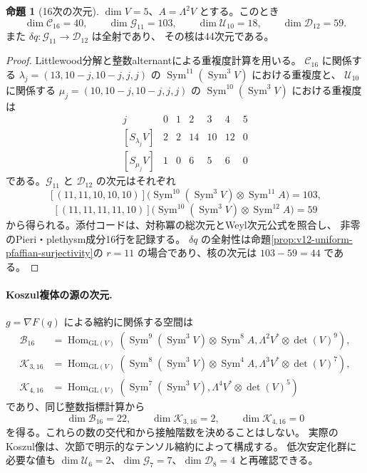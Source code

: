 \documentclass[a4paper,11pt]{ltjsarticle}
\theoremstyle{definition}
\newtheorem{proposition}[theorem]{命題}
\begin{document}
\begin{proposition}[16次の次元]
\label{prop:v13-sixteenth-characters}
$\dim V=5$、$A=\Lambda^2V$ とする。このとき
\[
 \dim\mathcal C_{16}=40,\qquad
 \dim\mathcal G_{11}=103,\qquad
 \dim\mathcal U_{10}=18,\qquad
 \dim\mathcal D_{12}=59.
\]
また $\delta q:\mathcal G_{11}\to\mathcal D_{12}$ は全射であり、
その核は44次元である。
\end{proposition}
\begin{proof}
Littlewood分解と整数alternantによる重複度計算を用いる。
$\mathcal C_{16}$ に関係する
$\lambda_j=(13,10-j,10-j,j,j)$ の
$\operatorname{Sym}^{11}(\operatorname{Sym}^3V)$ における重複度と、
$\mathcal U_{10}$ に関係する
$\mu_j=(10,10-j,10-j,j,j)$ の
$\operatorname{Sym}^{10}(\operatorname{Sym}^3V)$ における重複度は
\[
\begin{array}{c|rrrrrr}
 j&0&1&2&3&4&5\\\hline
 {}[S_{\lambda_j}V]&2&2&14&10&12&0\\
 {}[S_{\mu_j}V]&1&0&6&5&6&0
\end{array}
\]
である。$\mathcal G_{11}$ と $\mathcal D_{12}$ の次元はそれぞれ
\[
 [(11,11,10,10,10)]
 \bigl(\operatorname{Sym}^{10}(\operatorname{Sym}^3V)
                    \otimes\operatorname{Sym}^{11}A\bigr)=103,
\]
\[
 [(11,11,11,11,10)]
 \bigl(\operatorname{Sym}^{10}(\operatorname{Sym}^3V)
                    \otimes\operatorname{Sym}^{12}A\bigr)=59
\]
から得られる。添付コードは、対称冪の総次元とWeyl次元公式を照合し、
非零のPieri・plethysm成分16行を記録する。
$\delta q$ の全射性は命題\ref{prop:v12-uniform-pfaffian-surjectivity}の
$r=11$ の場合であり、核の次元は $103-59=44$ である。
\end{proof}

\paragraph{Koszul複体の源の次元.}
$g=\nabla F(q)$ による縮約に関係する空間は
\begin{align*}
 \mathcal B_{16}&=\operatorname{Hom}_{\mathrm{GL}(V)}
 \left(\operatorname{Sym}^{9}(\operatorname{Sym}^3V)\otimes\operatorname{Sym}^{8}A,
        \Lambda^2V^*\otimes\det(V)^9\right),\\
 \mathcal K_{3,16}&=\operatorname{Hom}_{\mathrm{GL}(V)}
 \left(\operatorname{Sym}^{8}(\operatorname{Sym}^3V)\otimes\operatorname{Sym}^{4}A,
        \Lambda^3V^*\otimes\det(V)^7\right),\\
 \mathcal K_{4,16}&=\operatorname{Hom}_{\mathrm{GL}(V)}
 \left(\operatorname{Sym}^{7}(\operatorname{Sym}^3V),
        \Lambda^4V^*\otimes\det(V)^5\right)
\end{align*}
であり、同じ整数指標計算から
\[
 \dim\mathcal B_{16}=22,\qquad
 \dim\mathcal K_{3,16}=2,\qquad
 \dim\mathcal K_{4,16}=0
\]
を得る。これらの数の交代和から接触階数を決めることはしない。
実際のKoszul像は、次節で明示的なテンソル縮約によって構成する。
低次安定化群に必要な値も
$\dim\mathcal U_6=2$、$\dim\mathcal G_7=7$、$\dim\mathcal D_8=4$ と再確認できる。
\end{document}
